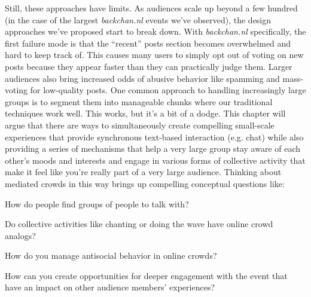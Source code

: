Still, these approaches have limits. As audiences scale up beyond a few hundred (in the case of the largest \emph{backchan.nl} events we've observed), the design approaches we've proposed start to break down. With \emph{backchan.nl} specifically, the first failure mode is that the ``recent'' posts section becomes overwhelmed and hard to keep track of. This causes many users to simply opt out of voting on new posts because they appear faster than they can practically judge them. Larger audiences also bring increased odds of abusive behavior like spamming and mass-voting for low-quality posts. One common approach to handling increasingly large groups is to segment them into manageable chunks where our traditional techniques work well.  This works, but it's a bit of a dodge. This chapter will argue that there are ways to simultaneously create compelling small-scale experiences that provide synchronous text-based interaction (e.g. chat) while also providing a series of mechanisms that help a very large group stay aware of each other's moods and interests and engage in various forms of collective activity that make it feel like you're really part of a very large audience. Thinking about mediated crowds in this way brings up compelling conceptual questions like: 

\begin{enumeration}
\item{How do people find groups of people to talk with?}
\item{Do collective activities like chanting or doing the wave have online crowd analogs?}
\item{How do you manage antisocial behavior in online crowds?}
\item{How can you create opportunities for deeper engagement with the event that have an impact on other audience members' experiences?}
\end{enumeration}

